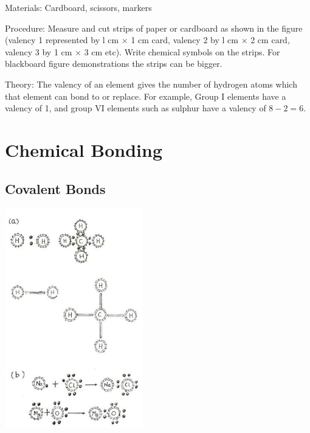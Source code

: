 \begin{multicols}{2}
\begin{description*}
\item[Materials:]{Cardboard, scissors, markers}
\item[Procedure:]{Measure and cut strips of paper or cardboard as shown in the figure (valency 1 represented by
l cm $\times$ 1 cm card, valency 2 by l cm $\times$ 2 cm card,
valency 3 by 1 cm $\times$ 3 cm etc). Write chemical
symbols on the strips. For blackboard figure
demonstrations the strips can be bigger.}
\item[Theory:]{The valency of an element gives the number of
hydrogen atoms which that element can bond to or
replace. For example, Group I elements have a valency of 1, and group VI elements such as sulphur have a valency of $8-2=6$.}
\end{description*}

\vfill
\columnbreak


\section*{Chemical Bonding}


\subsection{Covalent Bonds}

\begin{center}
\includegraphics[width=0.45\textwidth]{./img/source/covalent-bonds.jpg}
\end{center}


\end{multicols}
